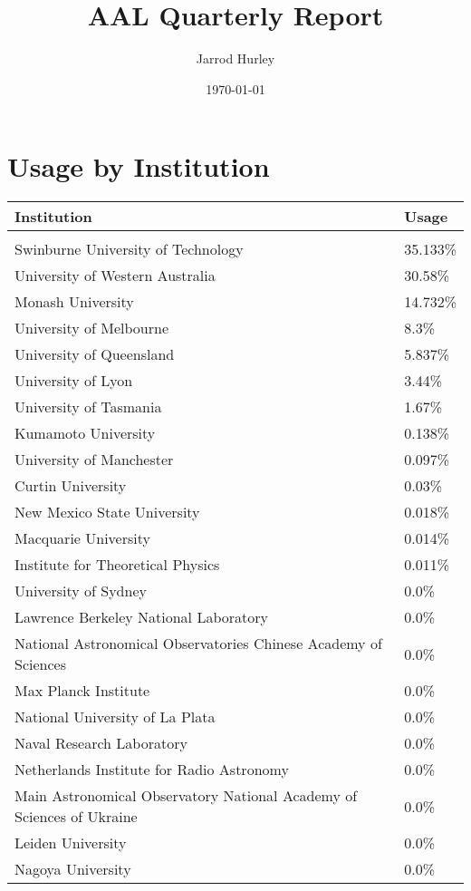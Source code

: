 \documentclass{article}%
\title{AAL Quarterly Report}%
\author{Jarrod Hurley}%
\date{\today}%
\begin{document}
%
\normalsize%
\maketitle%
\newpage%
\section{Usage by Institution }%

%
\begin{longtabu}{X[l] X[r]}%
\textbf{Institution}&\textbf{Usage}\\%
\hline%
&\\%
Swinburne University of Technology&35.133\%\\%
\hline%
University of Western Australia&30.58\%\\%
\hline%
Monash University&14.732\%\\%
\hline%
University of Melbourne&8.3\%\\%
\hline%
University of Queensland&5.837\%\\%
\hline%
University of Lyon&3.44\%\\%
\hline%
University of Tasmania&1.67\%\\%
\hline%
Kumamoto University&0.138\%\\%
\hline%
University of Manchester&0.097\%\\%
\hline%
Curtin University&0.03\%\\%
\hline%
New Mexico State University&0.018\%\\%
\hline%
Macquarie University&0.014\%\\%
\hline%
Institute for Theoretical Physics&0.011\%\\%
\hline%
University of Sydney&0.0\%\\%
\hline%
Lawrence Berkeley National Laboratory&0.0\%\\%
\hline%
National Astronomical Observatories Chinese Academy of Sciences&0.0\%\\%
\hline%
Max Planck Institute&0.0\%\\%
\hline%
National University of La Plata&0.0\%\\%
\hline%
Naval Research Laboratory&0.0\%\\%
\hline%
Netherlands Institute for Radio Astronomy&0.0\%\\%
\hline%
Main Astronomical Observatory National Academy of Sciences of Ukraine&0.0\%\\%
\hline%
Leiden University&0.0\%\\%
\hline%
Nagoya University&0.0\%\\%

\end{longtabu}
\end{document}
